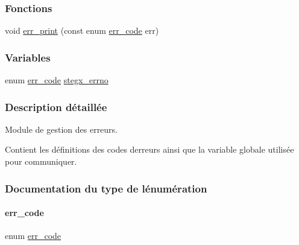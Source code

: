 \subsubsection*{Fonctions}
\begin{DoxyCompactItemize}
\item 
void \hyperlink{a00011_a5d0d86cd09d47446c87bf95c6f83cfb5}{err\+\_\+print} (const enum \hyperlink{a00011_a08b18ac8af0f3462354240d9732f3852}{err\+\_\+code} err)
\end{DoxyCompactItemize}
\subsubsection*{Variables}
\begin{DoxyCompactItemize}
\item 
enum \hyperlink{a00011_a08b18ac8af0f3462354240d9732f3852}{err\+\_\+code} \hyperlink{a00011_a5ec48ccdfbe19fe23855818f8556abec}{stegx\+\_\+errno}
\end{DoxyCompactItemize}


\subsubsection{Description détaillée}
Module de gestion des erreurs. 

Contient les définitions des codes d\textquotesingle{}erreurs ainsi que la variable globale utilisée pour communiquer. 

\subsubsection{Documentation du type de l\textquotesingle{}énumération}
\mbox{\label{a00011_a08b18ac8af0f3462354240d9732f3852}} 
\paragraph{\texorpdfstring{err\+\_\+code}{err\_code}}
{\footnotesize\ttfamily enum \hyperlink{a00011_a08b18ac8af0f3462354240d9732f3852}{err\+\_\+code}}

